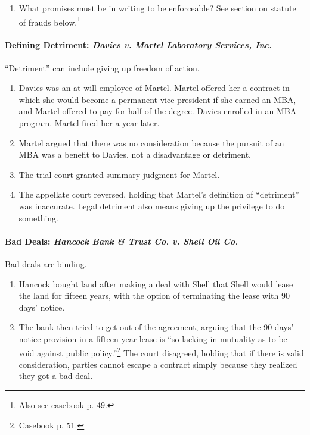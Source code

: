 \begin{enumerate}
    \item What promises must be in writing to be enforceable? See section on 
    statute of frauds below.\footnote{Also see casebook p. 49.}
\end{enumerate}

\paragraph{Defining Detriment: \emph{Davies v. Martel Laboratory Services, 
Inc.}}

``Detriment'' can include giving up freedom of action.

\begin{enumerate}
    \item Davies was an at-will employee of Martel. Martel offered her a 
    contract in which she would become a permanent vice president if she 
    earned an MBA, and Martel offered to pay for half of the degree. Davies 
    enrolled in an MBA program. Martel fired her a year later.
    \item Martel argued that there was no consideration because the pursuit of 
    an MBA was a benefit to Davies, not a disadvantage or detriment.
    \item The trial court granted summary judgment for Martel.
    \item The appellate court reversed, holding that Martel's definition of 
    ``detriment'' was inaccurate. Legal detriment also means giving up the 
    privilege to do something.
\end{enumerate}

\paragraph{Bad Deals: \emph{Hancock Bank \& Trust Co. v. Shell Oil Co.}}

Bad deals are binding.

\begin{enumerate}
    \item Hancock bought land after making a deal with Shell that Shell would 
    lease the land for fifteen years, with the option of terminating the lease 
    with 90 days' notice.
    \item The bank then tried to get out of the agreement, arguing that the 90 
    days' notice provision in a fifteen-year lease is ``so lacking in 
    mutuality as to be void against public policy.''\footnote{Casebook p. 51.} 
    The court disagreed, holding that if there is valid consideration, parties 
    cannot escape a contract simply because they realized they got a bad deal.
\end{enumerate}


